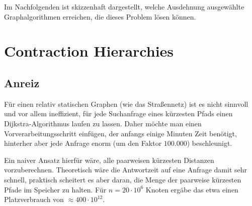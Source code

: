 \documentclass{scrartcl}%
\begin{document}
    \vspace*{0.3cm}
    Im Nachfolgenden ist skizzenhaft dargestellt, welche Ausdehnung ausgewählte Graphalgorithmen erreichen, die dieses Problem lösen können.
    \begin{figure}[htb]
        \centering
    \end{figure}

    \section*{Contraction Hierarchies}\label{sec:contractionHierarchies}
    \subsection*{Anreiz}

    Für einen relativ statischen Graphen (wie das Straßennetz) ist es nicht sinnvoll und vor allem ineffizient,
    für jede Suchanfrage eines kürzesten Pfads einen Dijkstra-Algorithmus laufen zu lassen.
    Daher möchte man einen Vorverarbeitungsschritt einfügen, der anfangs einige Minuten Zeit benötigt,
    hinterher aber jede Anfrage enorm (um den Faktor $100.000$) beschleunigt.

    Ein naiver Ansatz hierfür wäre, alle paarweisen kürzesten Distanzen vorzuberechnen.
    Theoretisch wäre die Antwortzeit auf eine Anfrage damit sehr schnell, praktisch scheitert es aber daran,
    die Menge der paarweise kürzesten Pfade im Speicher zu halten.
    Für $n=20 \cdot 10^6$ Knoten ergäbe das etwa einen Platzverbrauch von $\approx 400 \cdot 10^{12}$.
\end{document}
